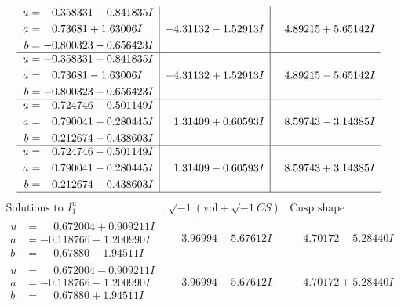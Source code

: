 \documentclass[1p]{elsarticle_modified}
\theoremstyle{definition}
\newcommand{\I}{\sqrt{-1}}
\begin{document}
$$\begin{array}{c|c|c}
\begin{aligned}
u &= -0.358331 + 0.841835 I \\
a &= \phantom{-}0.73681 + 1.63006 I \\
b &= -0.800323 - 0.656423 I\end{aligned}
 & -4.31132 - 1.52913 I & \phantom{-}4.89215 + 5.65142 I \\ \hline\begin{aligned}
u &= -0.358331 - 0.841835 I \\
a &= \phantom{-}0.73681 - 1.63006 I \\
b &= -0.800323 + 0.656423 I\end{aligned}
 & -4.31132 + 1.52913 I & \phantom{-}4.89215 - 5.65142 I \\ \hline\begin{aligned}
u &= \phantom{-}0.724746 + 0.501149 I \\
a &= \phantom{-}0.790041 + 0.280445 I \\
b &= \phantom{-}0.212674 - 0.438603 I\end{aligned}
 & \phantom{-}1.31409 + 0.60593 I & \phantom{-}8.59743 - 3.14385 I \\ \hline\begin{aligned}
u &= \phantom{-}0.724746 - 0.501149 I \\
a &= \phantom{-}0.790041 - 0.280445 I \\
b &= \phantom{-}0.212674 + 0.438603 I\end{aligned}
 & \phantom{-}1.31409 - 0.60593 I & \phantom{-}8.59743 + 3.14385 I\\
 \hline 
 \end{array}$$\newpage$$\begin{array}{c|c|c}  
\text{Solutions to }I^u_{1}& \I (\text{vol} + \sqrt{-1}CS) & \text{Cusp shape}\\
 \hline 
\begin{aligned}
u &= \phantom{-}0.672004 + 0.909211 I \\
a &= -0.118766 + 1.200990 I \\
b &= \phantom{-}0.67880 - 1.94511 I\end{aligned}
 & \phantom{-}3.96994 + 5.67612 I & \phantom{-}4.70172 - 5.28440 I \\ \hline\begin{aligned}
u &= \phantom{-}0.672004 - 0.909211 I \\
a &= -0.118766 - 1.200990 I \\
b &= \phantom{-}0.67880 + 1.94511 I\end{aligned}
 & \phantom{-}3.96994 - 5.67612 I & \phantom{-}4.70172 + 5.28440 I \\ \hline\begin{aligned}

\end{aligned}
\end{array}$$
\end{document}
